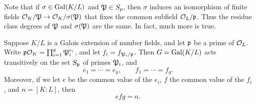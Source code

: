 Note that if $\sigma\in\Gal(K/L)$ and $\P\in S_p$, then $\sigma$
induces an isomorphism of finite fields $\O_K/\P\to \O_K/\sigma(\P)$
that fixes the common subfield $\O_L/\p$.  Thus the residue class
degrees of $\P$ and $\sigma(\P)$ are the same.  In fact, much more is
true.
\begin{theorem}\label{thm:transitive}
	Suppose $K/L$ is a Galois extension of number fields,
	and let $\p$ be a prime of $\O_L$.  Write
	$\p\O_K=\prod_{i=1}^g \P_i^{e_i}$, and let $f_i = f_{\P_i/\p}$.
	Then $G=\Gal(K/L)$ acts transitively on the set
	$S_\p$ of primes $\P_i$, and
	$$
		e_1=\cdots =e_g, \qquad f_1 =\cdots = f_g.
	$$
	Moreover, if we let $e$ be the common value of the $e_i$,
	$f$ the common value of the $f_i$, and $n=[K:L]$, then
	$$
		efg=n.
	$$
\end{theorem}
